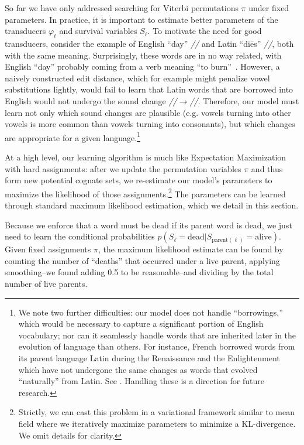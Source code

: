 \documentclass[11pt,a4paper]{article}
\begin{document}
So far we have only addressed searching for Viterbi permutations
$\pi$ under fixed parameters. In practice, it is important to
estimate better parameters of the transducers $\varphi_\ell$ and
survival variables $S_\ell$. To motivate the need for good transducers,
consider the example of English ``day'' \textit{//}
and Latin ``di\=es'' \textit{//}, both with the same
meaning.  Surprisingly, these words are in no way related, with
English ``day'' probably coming from a verb meaning ``to
burn''~\cite{oedDay}. However, a na\:ively constructed edit distance,
which for example might penalize vowel substitutions lightly, would
fail to learn that Latin words that are borrowed into English would
not undergo the sound change \textit{//}$ \to
$\textit{//}.  Therefore, our model must learn not only
which sound changes are plausible (e.g. vowels turning into other
vowels is more common than vowels turning into consonants), but
which changes are appropriate for a given language.\footnote{We
note two further difficulties: our model does not handle ``borrowings,''
which would be necessary to capture a significant portion of English
vocabulary; nor can it seamlessly handle words that are inherited
later in the evolution of language than others. For instance, French
borrowed words from its parent language Latin during the Renaissance
and the Enlightenment which have not undergone the same changes as
words that evolved ``naturally'' from Latin. See
. Handling these is a direction for
future research.}

At a high level, our learning algorithm is much like Expectation
Maximization with hard assignments: after we update the permutation
variables $\pi$ and thus form new potential cognate sets, we
re-estimate our model's parameters to maximize the likelihood of
those assignments.\footnote{Strictly, we can cast this problem in
a variational framework similar to mean field where we iteratively
maximize parameters to minimize a KL-divergence. We omit details
for clarity.} The parameters can be learned through standard maximum
likelihood estimation, which we detail in this section.

Because we enforce that a word must be dead if its parent word is
dead, we just need to learn the conditional probabilities
$p(S_\ell=\mathrm{dead}| S_{\mathrm{parent}(\ell)}=\mathrm{alive})$.
Given fixed assignments $\pi$, the maximum likelihood estimate can
be found by counting the number of ``deaths'' that occurred under
a live parent, applying smoothing--we found adding 0.5 to be
reasonable--and dividing by the total number of live parents.
\end{document}
